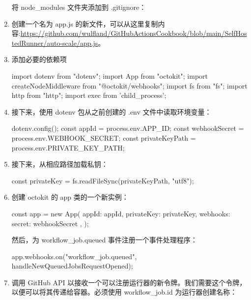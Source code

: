 \begin{enumerate}
将 node\_modules 文件夹添加到 .gitignore：


\item 
创建一个名为 app.js 的新文件，可以从这里复制内容:\url{https://github.com/wulfland/GitHubActionsCookbook/blob/main/SelfHostedRunner/auto-scale/app.js}。

\item 
添加必要的依赖项

\begin{shell}
import dotenv from "dotenv";
import {App} from "octokit";
import {createNodeMiddleware} from "@octokit/webhooks";
import fs from "fs";
import http from "http";
import { exec } from 'child_process';
\end{shell}

\item 
接下来，使用 dotenv 包从之前创建的 .env 文件中读取环境变量：

\begin{shell}
dotenv.config();
const appId = process.env.APP_ID;
const webhookSecret = process.env.WEBHOOK_SECRET;
const privateKeyPath = process.env.PRIVATE_KEY_PATH;
\end{shell}

\item 
接下来，从相应路径加载私钥：

\begin{shell}
const privateKey = fs.readFileSync(privateKeyPath, "utf8");
\end{shell}

\item 
创建 octokit 的 app 类的一个新实例：

\begin{shell}
const app = new App({
  appId: appId,
  privateKey: privateKey,
  webhooks: {
    secret: webhookSecret
  },
});
\end{shell}

然后，为 workflow\_job.queued 事件注册一个事件处理程序：

\begin{shell}
app.webhooks.on("workflow_job.queued", handleNewQueuedJobsRequestOpened);
\end{shell}

\item 
调用 GitHub API 以接收一个可以注册运行器的新令牌。我们需要这个令牌，以便可以将其传递给容器。必须使用 workflow\_job.id 为运行器创建名称：


\end{enumerate}
